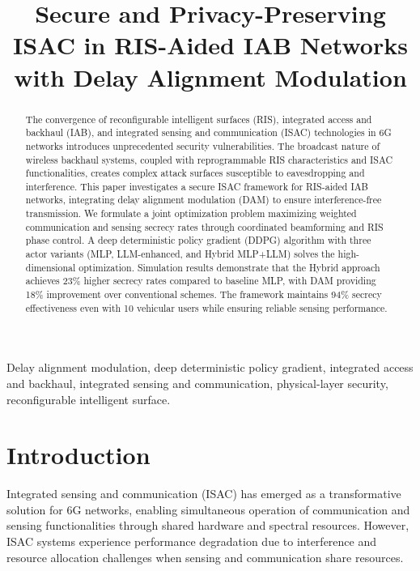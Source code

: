 \documentclass[conference]{IEEEtran}
\begin{document}
\title{Secure and Privacy-Preserving ISAC in RIS-Aided IAB Networks with Delay Alignment Modulation}
\maketitle

\begin{abstract}
The convergence of reconfigurable intelligent surfaces (RIS), integrated access and backhaul (IAB), and integrated sensing and communication (ISAC) technologies in 6G networks introduces unprecedented security vulnerabilities. The broadcast nature of wireless backhaul systems, coupled with reprogrammable RIS characteristics and ISAC functionalities, creates complex attack surfaces susceptible to eavesdropping and interference. This paper investigates a secure ISAC framework for RIS-aided IAB networks, integrating delay alignment modulation (DAM) to ensure interference-free transmission. We formulate a joint optimization problem maximizing weighted communication and sensing secrecy rates through coordinated beamforming and RIS phase control. A deep deterministic policy gradient (DDPG) algorithm with three actor variants (MLP, LLM-enhanced, and Hybrid MLP+LLM) solves the high-dimensional optimization. Simulation results demonstrate that the Hybrid approach achieves 23\% higher secrecy rates compared to baseline MLP, with DAM providing 18\% improvement over conventional schemes. The framework maintains 94\% secrecy effectiveness even with 10 vehicular users while ensuring reliable sensing performance.
\end{abstract}

\begin{IEEEkeywords}
Delay alignment modulation, deep deterministic policy gradient, integrated access and backhaul, integrated sensing and communication, physical-layer security, reconfigurable intelligent surface.
\end{IEEEkeywords}

\section{Introduction}

Integrated sensing and communication (ISAC) has emerged as a transformative solution for 6G networks, enabling simultaneous operation of communication and sensing functionalities through shared hardware and spectral resources. However, ISAC systems experience performance degradation due to interference and resource allocation challenges when sensing and communication share resources. 
\end{document}
